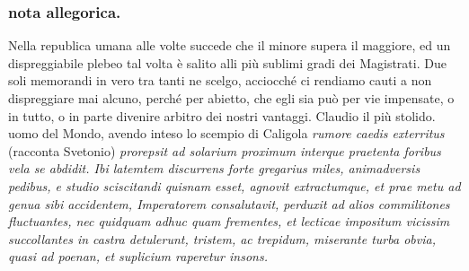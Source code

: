 \documentclass[11pt,a6paper]{article}
\begin{document}
\subsubsection{nota allegorica.}
{\footnotesize
Nella republica umana alle volte succede che
il minore supera il maggiore, ed un dispreggiabile
plebeo tal volta è salito alli più sublimi gradi dei
Magistrati. Due soli memorandi in vero tra tanti
ne scelgo, acciocché ci rendiamo cauti a non dispreggiare
mai alcuno, perché per abietto, che egli
sia può per vie impensate, o in tutto, o in parte
divenire arbitro dei nostri vantaggi. Claudio il più
stolido. uomo del Mondo, avendo inteso lo scempio
di Caligola \textit{rumore caedis exterritus} (racconta
Svetonio) \textit{prorepsit ad solarium proximum interque
praetenta foribus vela se abdidit. Ibi latemtem
discurrens forte gregarius miles, animadversis pedibus,
e studio sciscitandi quisnam esset, agnovit
extractumque, et prae metu ad genua sibi
accidentem, Imperatorem consalutavit, perduxit ad
alios commilitones fluctuantes, nec quidquam adhuc
quam frementes, et lecticae impositum vicissim
succollantes in castra detulerunt, tristem, ac
trepidum, miserante turba obvia, quasi ad poenan, et
suplicium raperetur insons.}

}
\end{document}
